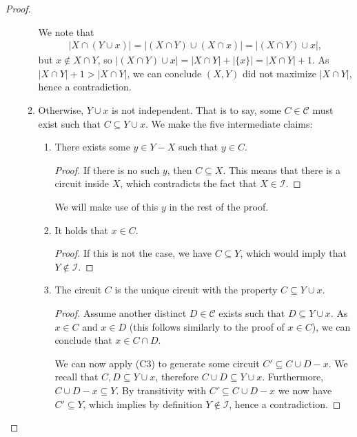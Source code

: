 \begin{proof}
\begin{enumerate}
\begin{enumerate}
            We note that 
              \begin{align*}
              |X \cap (Y \cup x)| = |(X \cap Y) \cup (X \cap x)| = |(X \cap Y) \cup x|,
              \end{align*}
              but $x \not\in X \cap Y$, so $|(X \cap Y) \cup x| = |X \cap Y| + |\{x\}| = |X \cap Y| + 1$. As $|X \cap Y| + 1 > |X \cap Y|$, we can conclude $(X, Y)$ did not maximize $|X \cap Y|$, hence a contradiction.
            \item Otherwise, $Y \cup x$ is not independent. That is to say, some $C \in \mathcal C$ must exist such that $C \subseteq Y \cup x$. We make the five intermediate claims:
            \begin{enumerate}
              \item There exists some $y \in Y - X$ such that $y \in C$.
                \begin{proof}
                  If there is no such $y$, then $C \subseteq X$. This means that there is a circuit inside $X$, which contradicts the fact that $X \in \mathcal{I}$.
                \end{proof}

                We will make use of this $y$ in the rest of the proof.
              \item It holds that $x \in C$.
                \begin{proof}
                  If this is not the case, we have $C \subseteq Y$, which would imply that $Y \not\in \mathcal I$.
                \end{proof}
              \item The circuit $C$ is the unique circuit with the property $C \subseteq Y \cup x.$
                \begin{proof}
                  Assume another distinct $D \in \mathcal C$ exists such that $D \subseteq Y \cup x$. As $x \in C$ and $x \in D$ (this follows similarly to the proof of $x \in C$), we can conclude that $x \in C \cap D$. 

                  We can now apply (C3) to generate some circuit $C' \subseteq  C \cup D - x$. We recall that $C, D \subseteq Y \cup x$, therefore $C \cup D \subseteq Y \cup x$. Furthermore, $C \cup D - x \subseteq Y$. By transitivity with $C' \subseteq C \cup D - x$ we now have $C' \subseteq Y$, which implies by definition $Y \not\in \mathcal I$, hence a contradiction.
                \end{proof}



\end{enumerate}
\end{enumerate}
\end{enumerate}
\end{proof}
